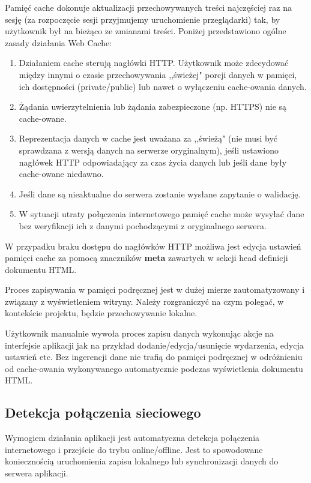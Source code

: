 Pamięć cache dokonuje aktualizacji przechowywanych treści najczęściej raz na sesję (za rozpoczęcie sesji przyjmujemy uruchomienie przeglądarki) tak, by użytkownik był na bieżąco ze zmianami treści. Poniżej przedstawiono ogólne zasady działania Web Cache\cite{cache}:

\begin{enumerate}
\item Działaniem cache sterują nagłówki HTTP. Użytkownik może zdecydować między innymi o czasie przechowywania ,,świeżej"{} porcji danych w pamięci, ich dostępności (private/public) lub nawet o wyłączeniu cache-owania danych.
\item Żądania uwierzytelnienia lub żądania zabezpieczone (np. HTTPS\cite{https}) nie są cache-owane.
\item Reprezentacja danych w cache jest uważana za ,,świeżą"{} (nie musi być sprawdzana z wersją danych na serwerze oryginalnym), jeśli ustawiono nagłówek HTTP odpowiadający za czas życia danych lub jeśli dane były cache-owane niedawno.
\item Jeśli dane są nieaktualne do serwera zostanie wysłane zapytanie o walidację.
\item W sytuacji utraty połączenia internetowego pamięć cache może wysyłać dane bez weryfikacji ich z danymi pochodzącymi z oryginalnego serwera.
\end{enumerate}

W przypadku braku dostępu do nagłówków HTTP możliwa jest edycja ustawień pamięci cache za pomocą znaczników \textbf{meta} zawartych w sekcji head definicji dokumentu HTML.

Proces zapisywania w pamięci podręcznej jest w dużej mierze zautomatyzowany i związany z wyświetleniem witryny. Należy rozgraniczyć na czym polegać, w kontekście projektu, będzie przechowywanie lokalne.

Użytkownik manualnie wywoła proces zapisu danych wykonując akcje na interfejsie aplikacji jak na przykład dodanie/edycja/usunięcie wydarzenia, edycja ustawień etc. Bez ingerencji dane nie trafią do pamięci podręcznej w odróżnieniu od cache-owania wykonywanego automatycznie podczas wyświetlenia dokumentu HTML.

\subsection{Detekcja połączenia sieciowego}
\label{sec:detPolSieciowego}

Wymogiem działania aplikacji jest automatyczna detekcja połączenia internetowego i przejście do trybu online/offline. Jest to spowodowane koniecznością uruchomienia zapisu lokalnego lub synchronizacji danych do serwera aplikacji.

